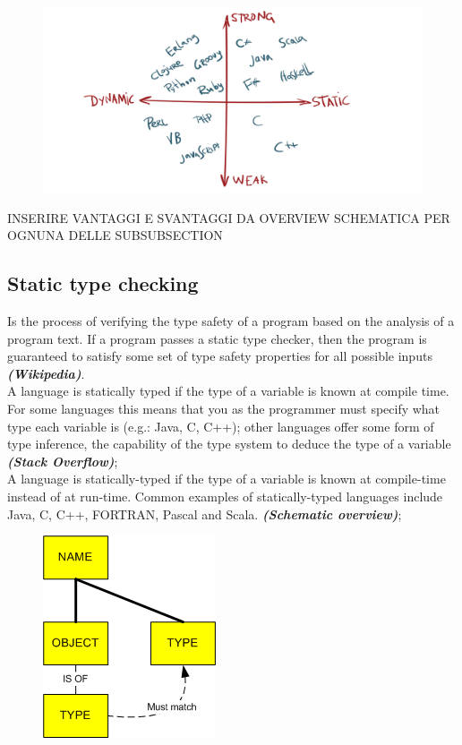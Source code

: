 \documentclass[12pt]{article}
\begin{document}
	\begin{figure}[h!]
		\centering
		\includegraphics[scale=0.20]{img/classification.png}
	\end{figure}

		INSERIRE VANTAGGI E SVANTAGGI DA OVERVIEW SCHEMATICA PER OGNUNA DELLE SUBSUBSECTION
	\subsection{Static type checking}
		Is the process of verifying the type safety of a program based on the analysis of a program text.  If a program passes a static type checker, then the program is guaranteed to satisfy some set of type safety properties for all possible inputs \textit{\textbf{(Wikipedia)}}.\\
		A language is statically typed if the type of a variable is known at compile time. For some languages this means that you as the programmer must specify what type each variable is (e.g.: Java, C, C++); other languages offer some form of type inference, the capability of the type system to deduce the type of a variable \textit{\textbf{(Stack Overflow)}};\\
		A language is statically-typed if the type of a variable is known at compile-time instead of at run-time. Common examples of statically-typed languages include Java, C, C++, FORTRAN, Pascal and Scala. \textbf{\textit{(Schematic overview)}};\\
		
		\begin{figure}[h!]
			\centering
			\includegraphics[scale=0.60]{img/static.png}
		\end{figure}
	
\end{document}
